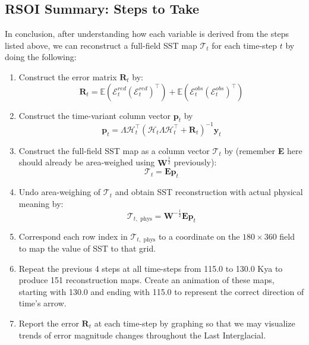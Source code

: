 \documentclass{article}
\begin{document}
\subsection{RSOI Summary: Steps to Take}
In conclusion, after understanding how each variable is derived from the steps listed above, we can reconstruct a full-field SST map $\mathcal{T}_t$ for each time-step $t$ by doing the following:
\begin{enumerate}
    \item Construct the error matrix $\textbf{R}_t$ by:
    $$\textbf{R}_t =\mathbb{E}(\mathcal{E}_t^{red} (\mathcal{E}_t^{red})^\intercal) + \mathbb{E}(\mathcal{E}_t^{obs} (\mathcal{E}_t^{obs})^\intercal)$$

    \item Construct the time-variant column vector $\textbf{p}_t$ by
    $${\textbf{p}_t} = {\Lambda \mathcal{H}_t^\intercal} ({\mathcal{H}_t \Lambda \mathcal{H}_t^\intercal} + {\textbf{R}_t})^{-1} {\textbf{y}_t}$$

    \item Construct the full-field SST map as a column vector $\mathcal{T}_t$ by (remember \textbf{E} here should already be area-weighed using $\textbf{W}^{\frac{1}{2}}$ previously):
    $$\mathcal{T}_t = \textbf{E} \textbf{p}_t$$

    \item Undo area-weighing of $\mathcal{T}_t$ and obtain SST reconstruction with actual physical meaning by:
    $$\mathcal{T}_{t, \text{ phys}} = \textbf{W}^{-\frac{1}{2}} \textbf{E} \textbf{p}_t$$

    \item Correspond each row index in $\mathcal{T}_{t, \text{ phys}}$ to a coordinate on the $180 \times 360$ field to map the value of SST to that grid.

    \item Repeat the previous 4 steps at all time-steps from 115.0 to 130.0 Kya to produce 151 reconstruction maps. Create an animation of these maps, starting with 130.0 and ending with 115.0 to represent the correct direction of time's arrow.
    
    \item Report the error $\textbf{R}_t$ at each time-step by graphing so that we may visualize trends of error magnitude changes throughout the Last Interglacial.
    
\end{enumerate}
\end{document}
